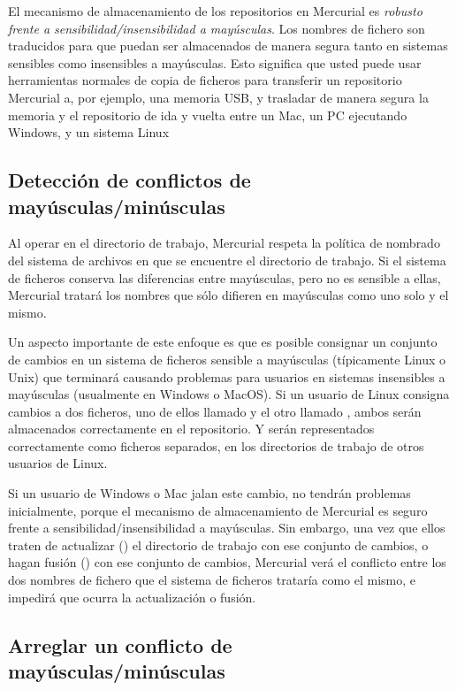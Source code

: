El mecanismo de almacenamiento de los repositorios en Mercurial es
\emph{robusto frente a sensibilidad/insensibilidad a mayúsculas}. Los nombres de
fichero son traducidos para que puedan ser almacenados de manera
segura tanto en sistemas sensibles como insensibles a mayúsculas. Esto
significa que usted puede usar herramientas normales de copia de
ficheros para transferir un repositorio Mercurial a, por ejemplo, una
memoria USB, y trasladar de manera segura la memoria y el repositorio
de ida y vuelta entre un Mac, un PC ejecutando Windows, y un sistema
Linux

\subsection{Detección de conflictos de mayúsculas/minúsculas}

Al operar en el directorio de trabajo, Mercurial respeta la política
de nombrado del sistema de archivos en que se encuentre el directorio
de trabajo. Si el sistema de ficheros conserva las diferencias entre
mayúsculas, pero no es sensible a ellas, Mercurial tratará los nombres
que sólo difieren en mayúsculas como uno solo y el mismo.

Un aspecto importante de este enfoque es que es posible consignar un
conjunto de cambios en un sistema de ficheros sensible a mayúsculas
(típicamente Linux o Unix) que terminará causando problemas para
usuarios en sistemas insensibles a mayúsculas (usualmente en Windows o
MacOS). Si un usuario de Linux consigna cambios a dos ficheros, uno de
ellos llamado  y el otro llamado ,
ambos serán almacenados correctamente en el repositorio. Y serán
representados correctamente como ficheros separados, en los
directorios de trabajo de otros usuarios de Linux.

Si un usuario de Windows o Mac jalan este cambio, no tendrán problemas
inicialmente, porque el mecanismo de almacenamiento de Mercurial es
seguro frente a sensibilidad/insensibilidad a mayúsculas. Sin embargo,
una vez que ellos traten de actualizar () el directorio
de trabajo con ese conjunto de cambios, o hagan fusión ()
con ese conjunto de cambios, Mercurial verá el conflicto entre los dos
nombres de fichero que el sistema de ficheros trataría como el mismo,
e impedirá que ocurra la actualización o fusión.

\subsection{Arreglar un conflicto de mayúsculas/minúsculas}

